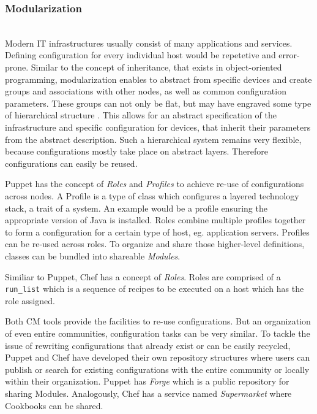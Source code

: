 \subsubsection{Modularization}\hfill\\

Modern IT infrastructures usually consist of many applications and services. Defining configuration for every individual host would be repetetive and error-prone. Similar to the concept of inheritance, that exists in object-oriented programming, modularization enables to abstract from specific devices and create groups and associations with other nodes, as well as common configuration parameters. These groups can not only be flat, but may have engraved some type of hierarchical structure \cite{delaet2010survey}. This allows for an abstract specification of the infrastructure and specific configuration for devices, that inherit their parameters from the abstract description. Such a hierarchical system remains very flexible, because configurations mostly take place on abstract layers. Therefore configurations can easily be reused.

Puppet has the concept of \textit{Roles} and \textit{Profiles} to achieve re-use of configurations across nodes. A Profile is a type of class which configures a layered technology stack, a trait of a system. An example would be a profile ensuring the appropriate version of Java is installed. Roles combine multiple profiles together to form a configuration for a certain type of host, eg. application servers. Profiles can be re-used across roles. To organize and share those higher-level definitions, classes can be bundled into shareable \textit{Modules}.

Similiar to Puppet, Chef has a concept of \textit{Roles}. Roles are comprised of a \texttt{run\_list} which is a sequence of recipes to be executed on a host which has the role assigned.

Both CM tools provide the facilities to re-use configurations. But an organization of even entire communities, configuration tasks can be very similar. To tackle the issue of rewriting configurations that already exist or can be easily recycled, Puppet and Chef have developed their own repository structures where users can publish or search for existing configurations with the entire community or locally within their organization. Puppet has \textit{Forge} which is a public repository for sharing Modules. Analogously, Chef has a service named \textit{Supermarket} where Cookbooks can be shared.

